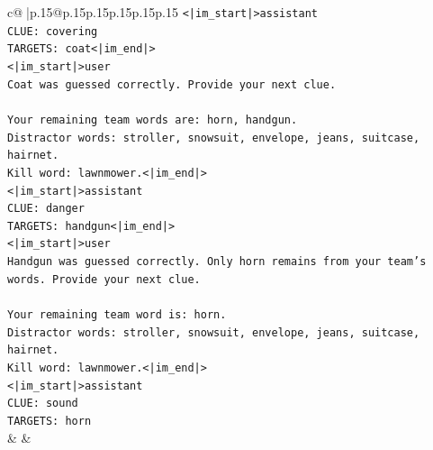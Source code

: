 \documentclass{article}
\begin{document}
{\begin{supertabular}{c@{$\;$}|p{.15\linewidth}@{}p{.15\linewidth}p{.15\linewidth}p{.15\linewidth}p{.15\linewidth}p{.15\linewidth}}
{{{\texttt{<|im\_start|>assistant} \\
\texttt{CLUE: covering} \\
\texttt{TARGETS: coat<|im\_end|>} \\
\texttt{<|im\_start|>user} \\
\texttt{Coat was guessed correctly. Provide your next clue.} \\
\\ 
\texttt{Your remaining team words are: horn, handgun.} \\
\texttt{Distractor words: stroller, snowsuit, envelope, jeans, suitcase, hairnet.} \\
\texttt{Kill word: lawnmower.<|im\_end|>} \\
\texttt{<|im\_start|>assistant} \\
\texttt{CLUE: danger} \\
\texttt{TARGETS: handgun<|im\_end|>} \\
\texttt{<|im\_start|>user} \\
\texttt{Handgun was guessed correctly. Only horn remains from your team's words. Provide your next clue.} \\
\\ 
\texttt{Your remaining team word is: horn.} \\
\texttt{Distractor words: stroller, snowsuit, envelope, jeans, suitcase, hairnet.} \\
\texttt{Kill word: lawnmower.<|im\_end|>} \\
\texttt{<|im\_start|>assistant} \\
\texttt{CLUE: sound} \\
\texttt{TARGETS: horn} \\
            }
        }
    }
    & & \\ \\


\end{supertabular}}
\end{document}

